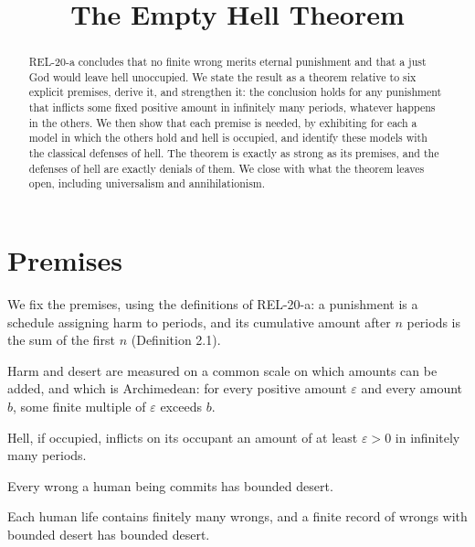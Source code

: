 \documentclass{situationist-preprint}
\title{The Empty Hell Theorem}
\begin{document}
\maketitle

\begin{abstract}
REL-20-a concludes that no finite wrong merits eternal punishment and that a just God would leave hell unoccupied. We state the result as a theorem relative to six explicit premises, derive it, and strengthen it: the conclusion holds for any punishment that inflicts some fixed positive amount in infinitely many periods, whatever happens in the others. We then show that each premise is needed, by exhibiting for each a model in which the others hold and hell is occupied, and identify these models with the classical defenses of hell. The theorem is exactly as strong as its premises, and the defenses of hell are exactly denials of them. We close with what the theorem leaves open, including universalism and annihilationism.
\end{abstract}

\section{Premises}

We fix the premises, using the definitions of REL-20-a: a punishment is a schedule assigning harm to periods, and its cumulative amount after $n$ periods is the sum of the first $n$ (Definition 2.1).

\begin{assumption}[Measure]\label{a:measure}
Harm and desert are measured on a common scale on which amounts can be added, and which is Archimedean: for every positive amount $\varepsilon$ and every amount $b$, some finite multiple of $\varepsilon$ exceeds $b$.
\end{assumption}

\begin{assumption}\label{a:eternal}
Hell, if occupied, inflicts on its occupant an amount of at least $\varepsilon > 0$ in infinitely many periods.
\end{assumption}

\begin{assumption}\label{a:wrongs}
Every wrong a human being commits has bounded desert.
\end{assumption}

\begin{assumption}\label{a:records}
Each human life contains finitely many wrongs, and a finite record of wrongs with bounded desert has bounded desert.
\end{assumption}
\end{document}
